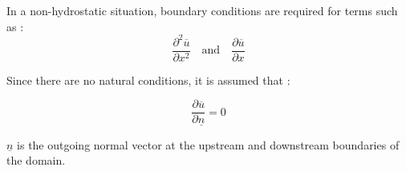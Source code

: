 \hspace*{1cm}

In a non-hydrostatic situation, boundary conditions are required for terms such as : 
$$\frac{\partial^2 \overline{u}}{\partial x^2}\quad\mbox{and}\quad\frac{\partial \overline{u}}{\partial x}$$

\vspace{0.5cm}

Since there are no natural conditions, it is assumed that :

$$\frac{\partial \overline{u}}{\partial \underline{n}} = 0$$

\vspace{0.5cm}

$\underline{n}$ is the outgoing normal vector at the upstream and downstream boundaries of the domain.

